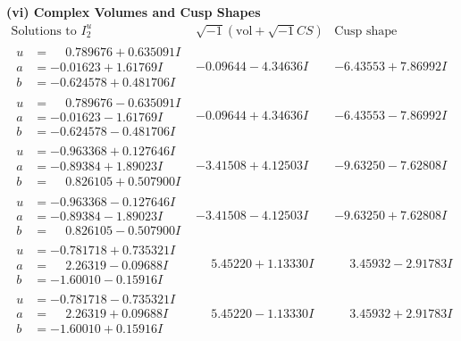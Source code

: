 \documentclass[1p]{elsarticle_modified}
\theoremstyle{definition}
\newcommand{\I}{\sqrt{-1}}
\begin{document}
\newpage\flushleft \textbf{(vi) Complex Volumes and Cusp Shapes}
$$\begin{array}{c|c|c}  
\text{Solutions to }I^u_{2}& \I (\text{vol} + \sqrt{-1}CS) & \text{Cusp shape}\\
 \hline 
\begin{aligned}
u &= \phantom{-}0.789676 + 0.635091 I \\
a &= -0.01623 + 1.61769 I \\
b &= -0.624578 + 0.481706 I\end{aligned}
 & -0.09644 - 4.34636 I & -6.43553 + 7.86992 I \\ \hline\begin{aligned}
u &= \phantom{-}0.789676 - 0.635091 I \\
a &= -0.01623 - 1.61769 I \\
b &= -0.624578 - 0.481706 I\end{aligned}
 & -0.09644 + 4.34636 I & -6.43553 - 7.86992 I \\ \hline\begin{aligned}
u &= -0.963368 + 0.127646 I \\
a &= -0.89384 + 1.89023 I \\
b &= \phantom{-}0.826105 + 0.507900 I\end{aligned}
 & -3.41508 + 4.12503 I & -9.63250 - 7.62808 I \\ \hline\begin{aligned}
u &= -0.963368 - 0.127646 I \\
a &= -0.89384 - 1.89023 I \\
b &= \phantom{-}0.826105 - 0.507900 I\end{aligned}
 & -3.41508 - 4.12503 I & -9.63250 + 7.62808 I \\ \hline\begin{aligned}
u &= -0.781718 + 0.735321 I \\
a &= \phantom{-}2.26319 - 0.09688 I \\
b &= -1.60010 - 0.15916 I\end{aligned}
 & \phantom{-}5.45220 + 1.13330 I & \phantom{-}3.45932 - 2.91783 I \\ \hline\begin{aligned}
u &= -0.781718 - 0.735321 I \\
a &= \phantom{-}2.26319 + 0.09688 I \\
b &= -1.60010 + 0.15916 I\end{aligned}
 & \phantom{-}5.45220 - 1.13330 I & \phantom{-}3.45932 + 2.91783 I \\ \hline\begin{aligned}

\end{aligned}
\end{array}$$
\end{document}
